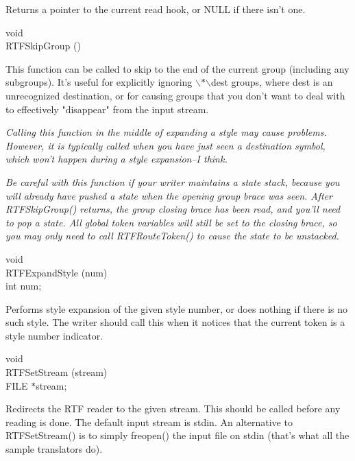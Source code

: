 \documentclass{article}
\begin{document}
\noindent
Returns a pointer to the current read hook, or NULL if there isn't one.




\noindent
void\\
RTFSkipGroup ()




\noindent
This function can be called to skip to the end of the current group (including 
any subgroups). It's useful for explicitly ignoring $\backslash $$\ast $$\backslash $dest 
groups, where dest is an unrecognized destination, or for causing groups 
that you don't want to deal with to effectively "disappear" from the input 
stream.



\noindent
{\em Calling this function in the middle of expanding a style may cause problems. 
However, it is typically called when you have just seen a destination symbol, 
which won't happen during a style expansion--I think.



\noindent
{\em Be careful with this function if your writer maintains a state stack, 
because you will already have pushed a state when the opening group brace 
was seen. After RTFSkipGroup() returns, the group closing brace has been 
read, and you'll need to pop a state. All global token variables will still 
be set to the closing brace, so you may only need to call RTFRouteToken() 
to cause the state to be unstacked.



}}
\noindent
void\\
RTFExpandStyle (num)\\
int	num;




\noindent
Performs style expansion of the given style number, or does nothing if there 
is no such style. The writer should call this when it notices that the current 
token is a style number indicator.




\noindent
void\\
RTFSetStream (stream)\\
FILE	$\ast $stream;




\noindent
Redirects the RTF reader to the given stream. This should be called before 
any reading is done. The default input stream is stdin. An alternative to 
RTFSetStream() is to simply freopen() the input file on stdin (that's what 
all the sample translators do).
\end{document}
